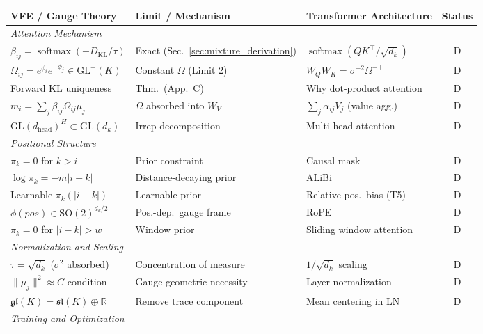 \documentclass[twoside,11pt]{article}
\newcommand{\softmax}{\operatorname{softmax}}
\newcommand{\KL}{\operatorname{KL}}
\begin{document}
\begin{table}[p]
\centering
\renewcommand{\arraystretch}{1.15}
\setlength{\tabcolsep}{4pt}
\small
\begin{tabular}{|l|l|l|c|}
\hline
\textbf{VFE / Gauge Theory} & \textbf{Limit / Mechanism} & \textbf{Transformer Architecture} & \textbf{Status} \\
\hline
\multicolumn{4}{|l|}{\textit{Attention Mechanism}} \\
\hline
$\beta_{ij} \!=\! \softmax(-D_{\KL}/\tau)$ & Exact (Sec.~\ref{sec:mixture_derivation}) & $\softmax(QK^\top\!/\!\sqrt{d_k})$ & D \\
$\Omega_{ij}\!=\!e^{\phi_i}e^{-\phi_j}\!\in\!\mathrm{GL}^+(K)$ & Constant $\Omega$ (Limit 2) & $W_Q W_K^\top\!=\!\sigma^{-2}\Omega^{-\top}$ & D \\
Forward KL uniqueness & Thm.\ (App.~C) & Why dot-product attention & D \\
$m_i \!=\! \sum_j \beta_{ij}\Omega_{ij}\mu_j$ & $\Omega$ absorbed into $W_V$ & $\sum_j \alpha_{ij} V_j$ (value agg.) & D \\
$\mathrm{GL}(d_{\text{head}})^H \!\subset\! \mathrm{GL}(d_k)$ & Irrep decomposition & Multi-head attention & D \\
\hline
\multicolumn{4}{|l|}{\textit{Positional Structure}} \\
\hline
$\pi_k = 0$ for $k > i$ & Prior constraint & Causal mask & D \\
$\log\pi_k = -m|i\!-\!k|$ & Distance-decaying prior & ALiBi & D \\
Learnable $\pi_k(|i\!-\!k|)$ & Learnable prior & Relative pos.\ bias (T5) & D \\
$\phi(pos) \!\in\! \mathrm{SO}(2)^{d_k/2}$ & Pos.-dep.\ gauge frame & RoPE & D \\
$\pi_k = 0$ for $|i\!-\!k|>w$ & Window prior & Sliding window attention & D \\
\hline
\multicolumn{4}{|l|}{\textit{Normalization and Scaling}} \\
\hline
$\tau = \sqrt{d_k}$ ($\sigma^2$ absorbed) & Concentration of measure & $1/\sqrt{d_k}$ scaling & D \\
$\|\mu_j\|^2 \approx C$ condition & Gauge-geometric necessity & Layer normalization & D \\
$\mathfrak{gl}(K) \!=\! \mathfrak{sl}(K) \oplus \mathbb{R}$ & Remove trace component & Mean centering in LN & D \\
\hline
\multicolumn{4}{|l|}{\textit{Training and Optimization}} \\
\hline

\end{tabular}
\end{table}
\end{document}
